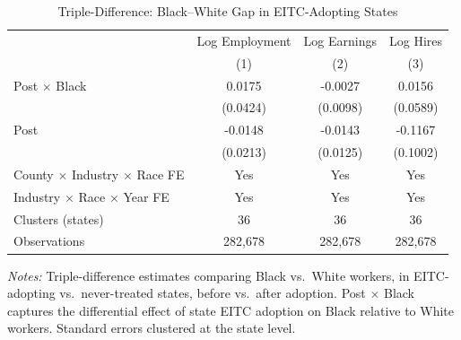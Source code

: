 \begin{table}[htbp]
\centering
\caption{Triple-Difference: Black--White Gap in EITC-Adopting States}
\label{tab:ddd}
\begin{tabular}{lccc}
\toprule
 & Log Employment & Log Earnings & Log Hires \\
 & (1) & (2) & (3) \\
\midrule
Post $\times$ Black & 0.0175 & -0.0027 & 0.0156 \\
 & (0.0424) & (0.0098) & (0.0589) \\
[4pt]
Post & -0.0148 & -0.0143 & -0.1167 \\
 & (0.0213) & (0.0125) & (0.1002) \\
\midrule
County $\times$ Industry $\times$ Race FE & Yes & Yes & Yes \\
Industry $\times$ Race $\times$ Year FE & Yes & Yes & Yes \\
Clusters (states) & 36 & 36 & 36 \\
Observations & 282,678 & 282,678 & 282,678 \\
\bottomrule
\end{tabular}
\begin{tablenotes}
\item \textit{Notes:} Triple-difference estimates comparing Black vs.\ White workers, in EITC-adopting vs.\ never-treated states, before vs.\ after adoption. Post $\times$ Black captures the differential effect of state EITC adoption on Black relative to White workers. Standard errors clustered at the state level.
\end{tablenotes}
\end{table}

